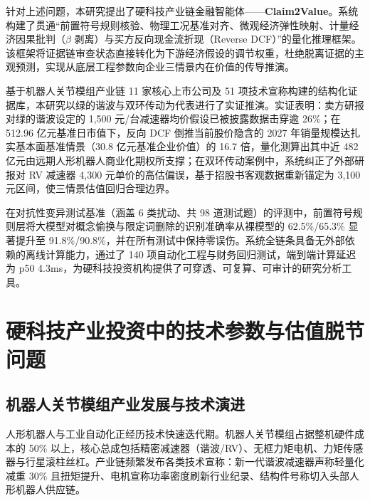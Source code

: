 \documentclass[11pt,a4paper]{ctexart}
\begin{document}
针对上述问题，本研究提出了硬科技产业链金融智能体——\textbf{Claim2Value}。系统构建了贯通“前置符号规则核验、物理工况基准对齐、微观经济弹性映射、计量经济因果批判（$\beta$ 剥离）与买方反向现金流折现（Reverse DCF）”的量化推理框架。该框架将证据链审查状态直接转化为下游经济假设的调节权重，杜绝脱离证据的主观预测，实现从底层工程参数向企业三情景内在价值的传导推演。

基于机器人关节模组产业链 11 家核心上市公司及 51 项技术宣称构建的结构化证据库，本研究以绿的谐波与双环传动为代表进行了实证推演。实证表明：卖方研报对绿的谐波设定的 1,500 元/台减速器均价假设已被披露数据击穿逾 26\%；在 512.96 亿元基准日市值下，反向 DCF 倒推当前股价隐含的 2027 年销量规模达扎实基本面基准情景（30.8 亿元基准企业价值）的 16.7 倍，量化测算出其中近 482 亿元由远期人形机器人商业化期权所支撑；在双环传动案例中，系统纠正了外部研报对 RV 减速器 4,300 元单价的高估偏误，基于招股书客观数据重新锚定为 3,100 元区间，使三情景估值回归合理边界。

在对抗性变异测试基准（涵盖 6 类扰动、共 98 道测试题）的评测中，前置符号规则层将大模型对概念偷换与限定词删除的识别准确率从裸模型的 62.5\%/65.3\% 显著提升至 91.8\%/90.8\%，并在所有测试中保持零误伤。系统全链条具备无外部依赖的离线计算能力，通过了 140 项自动化工程与财务回归测试，端到端计算延迟为 p50 4.3ms，为硬科技投资机构提供了可穿透、可复算、可审计的研究分析工具。

\newpage

\tableofcontents
\newpage

\section{硬科技产业投资中的技术参数与估值脱节问题}

\subsection{机器人关节模组产业发展与技术演进}

人形机器人与工业自动化正经历技术快速迭代期。机器人关节模组占据整机硬件成本的 50\% 以上，核心总成包括精密减速器（谐波/RV）、无框力矩电机、力矩传感器与行星滚柱丝杠。产业链频繁发布各类技术宣称：新一代谐波减速器声称轻量化减重 30\% 且扭矩提升、电机宣称功率密度刷新行业纪录、结构件号称切入头部人形机器人供应链。
\end{document}
